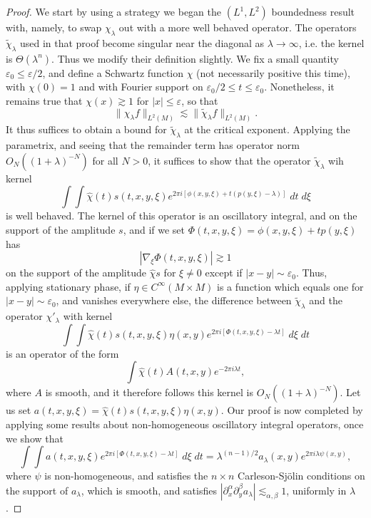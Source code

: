\begin{proof}
    We start by using a strategy we began the $(L^1,L^2)$ boundedness result with, namely, to swap $\chi_\lambda$ out with a more well behaved operator. The operators $\tilde{\chi}_\lambda$ used in that proof become singular near the diagonal as $\lambda \to \infty$, i.e. the kernel is $\Theta(\lambda^n)$. Thus we modify their definition slightly. We fix a small quantity $\varepsilon_0 \leq \varepsilon/2$, and define a Schwartz function $\chi$ (not necessarily positive this time), with $\chi(0) = 1$ and with Fourier support on $\varepsilon_0 / 2 \leq t \leq \varepsilon_0$. Nonetheless, it remains true that $\chi(x) \gtrsim 1$ for $|x| \leq \varepsilon$, so that
    \[ \| \chi_\lambda f \|_{L^2(M)} \lesssim \| \tilde{\chi}_\lambda f \|_{L^2(M)}. \]
    It thus suffices to obtain a bound for $\tilde{\chi}_\lambda$ at the critical exponent. Applying the parametrix, and seeing that the remainder term has operator norm $O_N((1 + \lambda)^{-N})$ for all $N > 0$, it suffices to show that the operator $\tilde{\chi}_\lambda$ wih kernel
    \[ \int \int \widehat{\chi}(t) s(t,x,y,\xi) e^{2 \pi i [\phi(x,y,\xi) + t(p(y,\xi) - \lambda)]}\; dt\; d\xi \]
    is well behaved. The kernel of this operator is an oscillatory integral, and on the support of the amplitude $s$, and if we set $\Phi(t,x,y,\xi) = \phi(x,y,\xi) + t p(y,\xi)$ has
    \[ |\nabla_\xi \Phi(t,x,y,\xi)| \gtrsim 1 \]
    on the support of the amplitude $\widehat{\chi} s$ for $\xi \neq 0$ except if $|x - y| \sim \varepsilon_0$. Thus, applying stationary phase, if $\eta \in C^\infty(M \times M)$ is a function which equals one for $|x - y| \sim \varepsilon_0$, and vanishes everywhere else, the difference between $\tilde{\chi}_\lambda$ and the operator $\chi'_\lambda$ with kernel
    \[ \int \int \widehat{\chi}(t) s(t,x,y,\xi) \eta(x,y) e^{2 \pi i [\Phi(t,x,y,\xi) - \lambda t]}\; d\xi\; dt \]
    is an operator of the form
    \[ \int \widehat{\chi}(t) A(t,x,y) e^{- 2 \pi i \lambda t}, \]
    where $A$ is smooth, and it therefore follows this kernel is $O_N((1 + \lambda)^{-N})$. Let us set $a(t,x,y,\xi) = \widehat{\chi}(t) s(t,x,y,\xi) \eta(x,y)$. Our proof is now completed by applying some results about non-homogeneous oscillatory integral operators, once we show that 
    \[ \int \int a(t,x,y,\xi) e^{2 \pi i [\Phi(t,x,y,\xi) - \lambda t]}\; d\xi\; dt = \lambda^{(n-1)/2} a_\lambda(x,y) e^{2 \pi i \lambda \psi(x,y)}, \]
    where $\psi$ is non-homogeneous, and satisfies the $n \times n$ Carleson-Sj\"{o}lin conditions on the support of $a_\lambda$, which is smooth, and satisfies $|\partial_x^\alpha \partial_y^\beta a_\lambda| \lesssim_{\alpha,\beta} 1$, uniformly in $\lambda$.
\end{proof}









